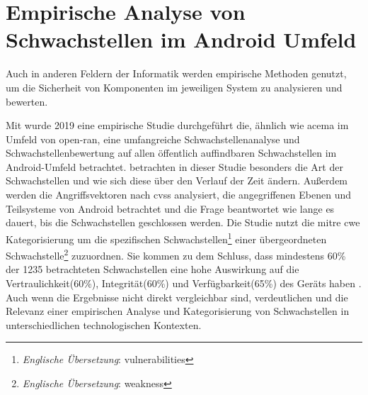 \section{Empirische Analyse von Schwachstellen im Android Umfeld}
\label{sec:forschungsstand-android}
Auch in anderen Feldern der Informatik werden empirische Methoden genutzt, um die Sicherheit von Komponenten im jeweiligen System zu analysieren und bewerten.
\par Mit  wurde 2019 eine empirische Studie durchgeführt die, ähnlich wie \gls{acema} im Umfeld von \gls{open-ran}, eine umfangreiche Schwachstellenanalyse und Schwachstellenbewertung auf allen öffentlich auffindbaren Schwachstellen im Android-Umfeld betrachtet. \citeauthor{mazuera-rozoAndroidOSStack2019} betrachten in dieser Studie besonders die Art der Schwachstellen und wie sich diese über den Verlauf der Zeit ändern. Außerdem werden die Angriffsvektoren nach \gls{cvss} analysiert, die angegriffenen Ebenen und Teilsysteme von Android betrachtet und die Frage beantwortet wie lange es dauert, bis die Schwachstellen geschlossen werden. Die Studie nutzt die \gls{mitre} \gls{cwe} Kategorisierung um die spezifischen Schwachstellen\footnote{\textit{Englische Übersetzung}: vulnerabilities} einer übergeordneten Schwachstelle\footnote{\textit{Englische Übersetzung}: weakness} zuzuordnen. Sie kommen zu dem Schluss, dass mindestens 60\% der 1235 betrachteten Schwachstellen eine hohe Auswirkung auf die Vertraulichkeit(60\%), Integrität(60\%) und Verfügbarkeit(65\%) des Geräts haben \autocite[Abbildung 8]{mazuera-rozoAndroidOSStack2019}. Auch wenn die Ergebnisse nicht direkt vergleichbar sind, verdeutlichen \autocite{mazuera-rozoAndroidOSStack2019} und \autocite{klementSecuring6GTransition2024} die Relevanz einer empirischen Analyse und Kategorisierung von Schwachstellen in unterschiedlichen technologischen Kontexten.